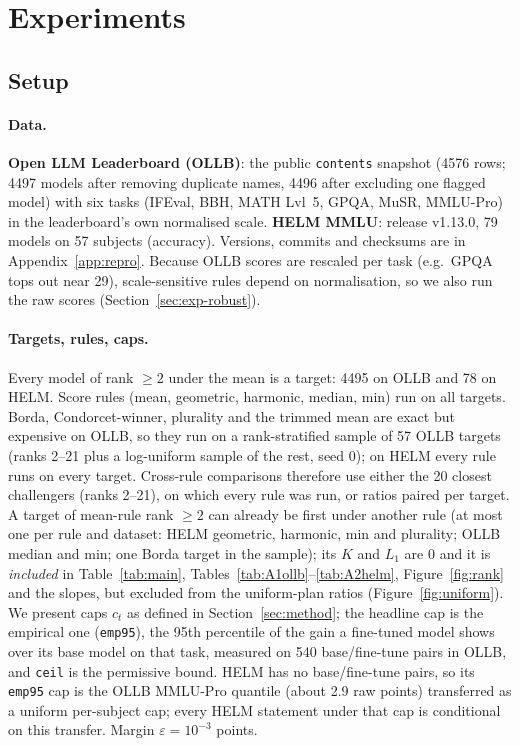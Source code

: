 \section{Experiments}
\label{sec:exp}

\subsection{Setup}
\label{sec:exp-setup}
\paragraph{Data.}
\textbf{Open LLM Leaderboard (OLLB)}: the public \texttt{contents} snapshot (4576 rows; 4497 models after removing duplicate names, 4496 after excluding one flagged model) with six tasks (IFEval, BBH, MATH Lvl~5, GPQA, MuSR, MMLU-Pro) in the leaderboard's own normalised scale.
\textbf{HELM MMLU}: release v1.13.0, 79 models on 57 subjects (accuracy). Versions, commits and checksums are in Appendix~\ref{app:repro}.
Because OLLB scores are rescaled per task (e.g.\ GPQA tops out near 29), scale-sensitive rules depend on normalisation, so we also run the raw scores (Section~\ref{sec:exp-robust}).

\paragraph{Targets, rules, caps.}
Every model of rank $\ge 2$ under the mean is a target: 4495 on OLLB and 78 on HELM.
Score rules (mean, geometric, harmonic, median, min) run on all targets. Borda, Condorcet-winner, plurality and the trimmed mean are exact but expensive on OLLB, so they run on a rank-stratified sample of 57 OLLB targets (ranks 2--21 plus a log-uniform sample of the rest, seed 0); on HELM every rule runs on every target.
Cross-rule comparisons therefore use either the 20 closest challengers (ranks 2--21), on which every rule was run, or ratios paired per target.
A target of mean-rule rank $\ge2$ can already be first under another rule (at most one per rule and dataset: HELM geometric, harmonic, min and plurality; OLLB median and min; one Borda target in the sample); its $K$ and $L_1$ are 0 and it is \emph{included} in Table~\ref{tab:main}, Tables~\ref{tab:A1ollb}--\ref{tab:A2helm}, Figure~\ref{fig:rank} and the slopes, but excluded from the uniform-plan ratios (Figure~\ref{fig:uniform}).
We present caps $c_t$ as defined in Section~\ref{sec:method}; the headline cap is the empirical one (\texttt{emp95}), the 95th percentile of the gain a fine-tuned model shows over its base model on that task, measured on 540 base/fine-tune pairs in OLLB, and \texttt{ceil} is the permissive bound.
HELM has no base/fine-tune pairs, so its \texttt{emp95} cap is the OLLB MMLU-Pro quantile (about 2.9 raw points) transferred as a uniform per-subject cap; every HELM statement under that cap is conditional on this transfer.
Margin $\varepsilon=10^{-3}$ points.

